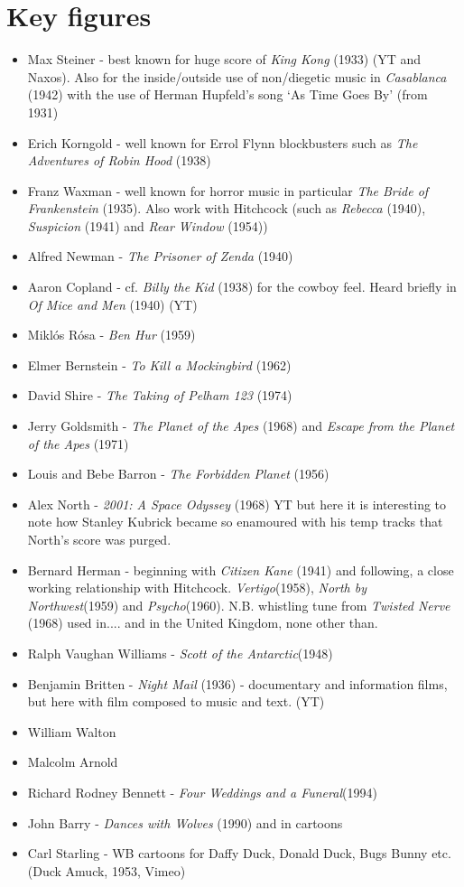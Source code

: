 \section{Key figures}
\begin{itemize}
\item Max Steiner - best known for huge score of \textit{King Kong} (1933) (YT and Naxos). Also for the inside/outside use of non/diegetic music in \textit{Casablanca} (1942) with the use of Herman Hupfeld's song `As Time Goes By' (from 1931) 
\item Erich Korngold - well known for Errol Flynn blockbusters such as \textit{The Adventures of Robin Hood} (1938)
\item Franz Waxman - well known for horror music in particular \textit{The Bride of Frankenstein} (1935). Also work with Hitchcock (such as \textit{Rebecca} (1940), \textit{Suspicion} (1941) and \textit{Rear Window} (1954))
\item Alfred Newman - \textit{The Prisoner of Zenda} (1940)
\item Aaron Copland - cf. \textit{Billy the Kid} (1938) for the cowboy feel. Heard briefly in \textit{Of Mice and Men} (1940) (YT)
\item Mikl\'os R\'osa - \textit{Ben Hur} (1959)
\item Elmer Bernstein - \textit{To Kill a Mockingbird} (1962)
\item David Shire - \textit{The Taking of Pelham 123} (1974)
\item Jerry Goldsmith - \textit{The Planet of the Apes} (1968) and \textit{Escape from the Planet of the Apes} (1971)
\item Louis and Bebe Barron - \textit{The Forbidden Planet} (1956)
\item Alex North - \textit{2001: A Space Odyssey} (1968) YT but here it is interesting to note how Stanley Kubrick became so enamoured with his temp tracks that North's score was purged. 
\item Bernard Herman - beginning with \textit{Citizen Kane} (1941) and following, a close working relationship with Hitchcock. \textit{Vertigo}(1958), \textit{North by Northwest}(1959) and \textit{Psycho}(1960). N.B. whistling tune from \textit{Twisted Nerve} (1968) used in....
and in the United Kingdom, none other than.

\item Ralph Vaughan Williams - \textit{Scott of the Antarctic}(1948)
\item Benjamin Britten - \textit{Night Mail} (1936) - documentary and information films, but here with film composed to music and text. (YT)
\item William Walton
\item Malcolm Arnold
\item Richard Rodney Bennett - \textit{Four Weddings and a Funeral}(1994)
\item John Barry - \textit{Dances with Wolves} (1990)
and in cartoons

\item Carl Starling - WB cartoons for Daffy Duck, Donald Duck, Bugs Bunny etc. (Duck Amuck, 1953,  Vimeo) 
\end{itemize}

